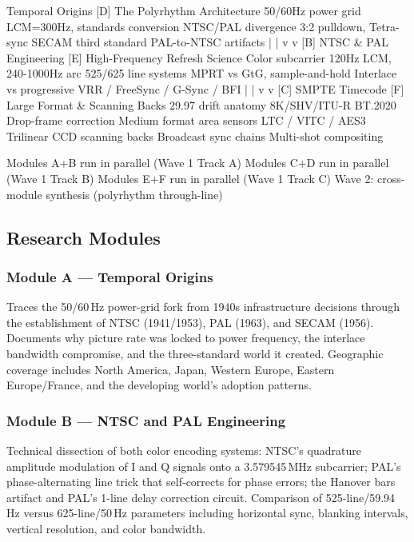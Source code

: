 \documentclass[11pt,letterpaper]{article}
\begin{document}
\begin{asciibox}
  [A] Temporal Origins         [D] The Polyrhythm Architecture
      50/60Hz power grid            LCM=300Hz, standards conversion
      NTSC/PAL divergence           3:2 pulldown, Tetra-sync
      SECAM third standard          PAL-to-NTSC artifacts
              |                              |
              v                              v
  [B] NTSC & PAL Engineering   [E] High-Frequency Refresh Science
      Color subcarrier              120Hz LCM, 240-1000Hz arc
      525/625 line systems          MPRT vs GtG, sample-and-hold
      Interlace vs progressive      VRR / FreeSync / G-Sync / BFI
              |                              |
              v                              v
  [C] SMPTE Timecode           [F] Large Format & Scanning Backs
      29.97 drift anatomy           8K/SHV/ITU-R BT.2020
      Drop-frame correction         Medium format area sensors
      LTC / VITC / AES3             Trilinear CCD scanning backs
      Broadcast sync chains         Multi-shot compositing

  Modules A+B run in parallel (Wave 1 Track A)
  Modules C+D run in parallel (Wave 1 Track B)
  Modules E+F run in parallel (Wave 1 Track C)
  Wave 2: cross-module synthesis (polyrhythm through-line)
\end{asciibox}

\subsection{Research Modules}

\subsubsection{Module A --- Temporal Origins}
Traces the 50/60\,Hz power-grid fork from 1940s infrastructure decisions through the establishment
of NTSC (1941/1953), PAL (1963), and SECAM (1956). Documents why picture rate was locked to power
frequency, the interlace bandwidth compromise, and the three-standard world it created. Geographic
coverage includes North America, Japan, Western Europe, Eastern Europe/France, and the developing
world's adoption patterns.

\subsubsection{Module B --- NTSC and PAL Engineering}
Technical dissection of both color encoding systems: NTSC's quadrature amplitude modulation of
I and Q signals onto a 3.579545\,MHz subcarrier; PAL's phase-alternating line trick that
self-corrects for phase errors; the Hanover bars artifact and PAL's 1-line delay correction circuit.
Comparison of 525-line/59.94\,Hz versus 625-line/50\,Hz parameters including horizontal sync,
blanking intervals, vertical resolution, and color bandwidth.
\end{document}
